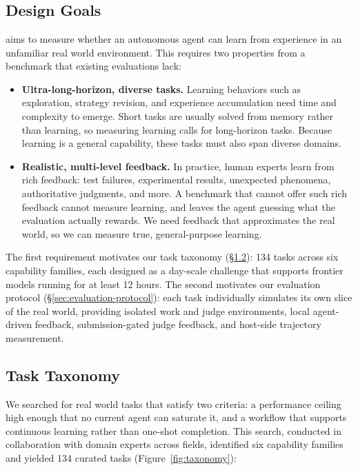 \section{\benchmark{}}

\subsection{Design Goals}

\benchmark{} aims to measure whether an autonomous agent can learn from experience in an unfamiliar real world environment. This requires two properties from a benchmark that existing evaluations lack:

\begin{itemize}
    \item \textbf{Ultra-long-horizon, diverse tasks.} Learning behaviors such as exploration, strategy revision, and experience accumulation need time and complexity to emerge. Short tasks are usually solved from memory rather than learning, so measuring learning calls for long-horizon tasks. Because learning is a general capability, these tasks must also span diverse domains.
    \item \textbf{Realistic, multi-level feedback.} In practice, human experts learn from rich feedback: test failures, experimental results, unexpected phenomena, authoritative judgments, and more. A benchmark that cannot offer such rich feedback cannot measure learning, and leaves the agent guessing what the evaluation actually rewards. We need feedback that approximates the real world, so we can measure true, general-purpose learning.
\end{itemize}

The first requirement motivates our task taxonomy (\S\ref{sec:taxonomy}): 134 tasks across six capability families, each designed as a day-scale challenge that supports frontier models running for at least 12 hours. The second motivates our evaluation protocol (\S\ref{sec:evaluation-protocol}): each task individually simulates its own slice of the real world, providing isolated work and judge environments, local agent-driven feedback, submission-gated judge feedback, and host-side trajectory measurement.

\subsection{Task Taxonomy}
\label{sec:taxonomy}

We searched for real world tasks that satisfy two criteria: a performance ceiling high enough that no current agent can saturate it, and a workflow that supports continuous learning rather than one-shot completion. This search, conducted in collaboration with domain experts across fields, identified six capability families and yielded 134 curated tasks (Figure~\ref{fig:taxonomy}):

